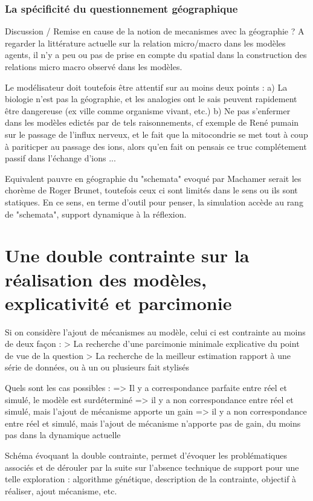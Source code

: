 \subsubsection{La spécificité du questionnement géographique}

Discussion / Remise en cause de la notion de mecanismes avec la géographie ? 
A regarder la littérature actuelle sur la relation micro/macro dans les modèles agents, il n'y a peu ou pas de prise en compte du spatial dans la construction des relations micro macro observé dans les modèles.

Le modélisateur doit toutefois être attentif sur au moins deux points : 
 a) La biologie n'est pas la géographie, et les analogies ont le sais peuvent rapidement être dangereuse (ex ville comme organisme vivant, etc.)
 b) Ne pas s'enfermer dans les modèles edictés par de tels raisonnements, cf exemple de René pumain sur le passage de l'influx nerveux, et le fait que la mitocondrie se met tout à coup à pariticper au passage des ions, alors qu'en fait on pensais ce truc complétement passif dans l'échange d'ions ... 

Equivalent pauvre en géographie du "schemata" evoqué par Machamer serait les chorème de Roger Brunet, toutefois ceux ci sont limités dans le sens ou ils sont statiques. En ce sens, en terme d'outil pour penser, la simulation accède au rang de "schemata", support dynamique à la réflexion.

\section{Une double contrainte sur la réalisation des modèles, explicativité et parcimonie}

Si on considère l'ajout de mécanismes au modèle, celui ci est contrainte au moins de deux façon : 
> La recherche d'une parcimonie minimale explicative du point de vue de la question
> La recherche de la meilleur estimation rapport à une série de données, ou à un ou plusieurs fait stylisés

Quels sont les cas possibles :
=> Il y a correspondance parfaite entre réel et simulé, le modèle est surdéterminé
=> il y a non correspondance entre réel et simulé, mais l'ajout de mécanisme apporte un gain
=> il y a non correspondance entre réel et simulé, mais l'ajout de mécanisme n'apporte pas de gain, du moins pas dans la dynamique actuelle

Schéma évoquant la double contrainte, permet d'évoquer les problématiques associés et de dérouler par la suite sur l'absence technique de support pour une telle exploration : algorithme génétique, description de la contrainte, objectif à réaliser, ajout mécanisme, etc.

